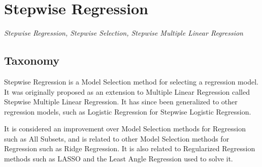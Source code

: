 
\section{Stepwise Regression} 
\label{sec:stepwise}

\emph{Stepwise Regression, Stepwise Selection, Stepwise Multiple Linear Regression}

\subsection{Taxonomy}
Stepwise Regression is a Model Selection method for selecting a regression model. It was originally proposed as an extension to Multiple Linear Regression called Stepwise Multiple Linear Regression. It has since been generalized to other regression models, such as Logistic Regression for Stepwise Logistic Regression.

It is considered an improvement over Model Selection methods for Regression such as All Subsets, and is related to other Model Selection methods for Regression such as Ridge Regression. It is also related to Regularized Regression methods such as LASSO and the Least Angle Regression used to solve it.

